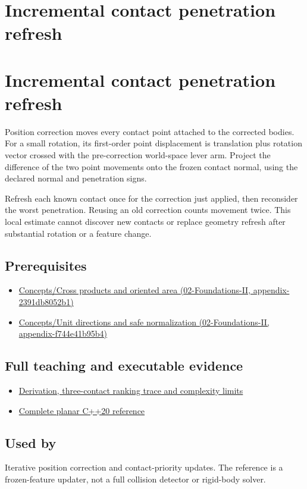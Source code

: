 \hypertarget{appendix-f682275acbdf}{}
\section*{Incremental contact penetration refresh}
\section{Incremental contact penetration refresh}\label{incremental-contact-penetration-refresh}

Position correction moves every contact point attached to the corrected bodies. For a small rotation, its first-order point displacement is translation plus rotation vector crossed with the pre-correction world-space lever arm. Project the difference of the two point movements onto the frozen contact normal, using the declared normal and penetration signs.

Refresh each known contact once for the correction just applied, then reconsider the worst penetration. Reusing an old correction counts movement twice. This local estimate cannot discover new contacts or replace geometry refresh after substantial rotation or a feature change.

\subsection{Prerequisites}\label{prerequisites}

\begin{itemize}
\tightlist
\item
  \href{}{Concepts/Cross products and oriented area (02-Foundations-II, appendix-2391db8052b1)}
\item
  \href{}{Concepts/Unit directions and safe normalization (02-Foundations-II, appendix-f744e41b95b4)}
\end{itemize}

\subsection{Full teaching and executable evidence}\label{full-teaching-and-executable-evidence}

\begin{itemize}
\tightlist
\item
  \href{Continuous\%20Notes/Game\%20Engine\%20-\%20From\%20First\%20Frame\%20to\%20Living\%20Worlds\#Refresh\%20neighboring\%20penetrations\%20after\%20position\%20correction}{Derivation, three-contact ranking trace and complexity limits}
\item
  \href{Continuous\%20Notes/Game\%20Engine\%20-\%20From\%20First\%20Frame\%20to\%20Living\%20Worlds\#A\%20planar\%20penetration\%20refresh\%20witness}{Complete planar C++20 reference}
\end{itemize}

\subsection{Used by}\label{used-by}

Iterative position correction and contact-priority updates. The reference is a frozen-feature updater, not a full collision detector or rigid-body solver.

